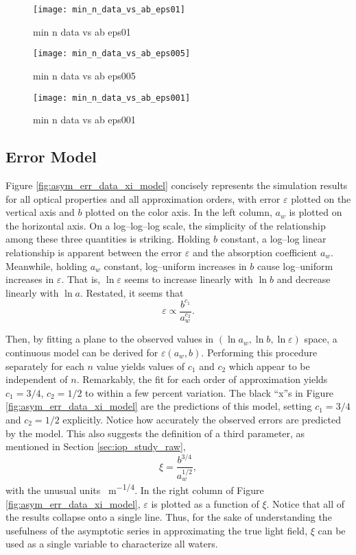 \begin{figure}[H]
  \centering
  \texttt{[image: min\_n\_data\_vs\_ab\_eps01]}
  \caption{min n data vs ab eps01}
  \label{fig:min_n_data_vs_ab_eps01}
\end{figure}

\begin{figure}[H]
  \centering
  \texttt{[image: min\_n\_data\_vs\_ab\_eps005]}
  \caption{min n data vs ab eps005}
  \label{fig:min_n_data_vs_ab_eps005}
\end{figure}

\begin{figure}[H]
  \centering
  \texttt{[image: min\_n\_data\_vs\_ab\_eps001]}
  \caption{min n data vs ab eps001}
  \label{fig:min_n_data_vs_ab_eps001}
\end{figure}

\subsection{Error Model}
Figure \ref{fig:asym_err_data_xi_model} concisely represents the simulation results for all optical properties and all approximation orders, with error $\varepsilon$ plotted on the vertical axis and $b$ plotted on the color axis.
In the left column, $a_w$ is plotted on the horizontal axis.
On a log--log--log scale, the simplicity of the relationship among these three quantities is striking.
Holding $b$ constant, a log--log linear relationship is apparent between the error $\varepsilon$ and the absorption coefficient $a_w$.
Meanwhile, holding $a_w$ constant, log--uniform increases in $b$ cause log--uniform increases in $\varepsilon$.
That is, $\ln\varepsilon$ seems to increase linearly with $\ln b$ and decrease linearly with $\ln a$.
Restated, it seems that
\begin{equation}
  \varepsilon \propto \frac{b^{c_1}}{a_w^{c_2}}.
\end{equation}

Then, by fitting a plane to the observed values in $(\ln a_w, \ln b, \ln \varepsilon)$ space, a continuous model can be derived for $\varepsilon(a_w, b)$.
Performing this procedure separately for each $n$ value yields values of $c_1$ and $c_2$ which appear to be independent of $n$.
Remarkably, the fit for each order of approximation yields $c_1=3/4$, $c_2=1/2$ to within a few percent variation.
The black ``x''s in Figure \ref{fig:asym_err_data_xi_model} are the predictions of this model, setting $c_1=3/4$ and $c_2=1/2$ explicitly.
Notice how accurately the observed errors are predicted by the model.
This also suggests the definition of a third parameter, as mentioned in Section \ref{sec:iop_study_raw},
\begin{equation}
  \xi = \frac{b^{3/4}}{a_w^{1/2}},
\end{equation}
with the unusual units \SI{}{\m^{-1/4}}.
In the right column of Figure \ref{fig:asym_err_data_xi_model}, $\varepsilon$ is plotted as a function of $\xi$.
Notice that all of the results collapse onto a single line.
Thus, for the sake of understanding the usefulness of the asymptotic series in approximating the true light field, $\xi$ can be used as a single variable to characterize all waters.


